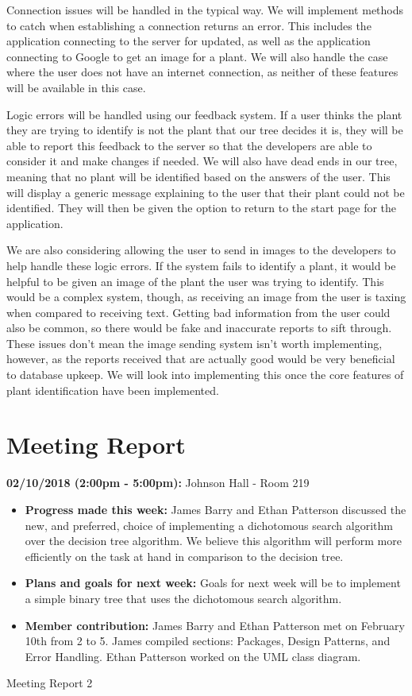 \documentclass[a4paper]{article}
\begin{document}
Connection issues will be handled in the typical way. We will implement methods to catch when establishing a connection returns an error. This includes the application connecting to the server for updated, as well as the application connecting to Google to get an image for a plant. We will also handle the case where the user does not have an internet connection, as neither of these features will be available in this case.

Logic errors will be handled using our feedback system. If a user thinks the plant they are trying to identify is not the plant that our tree decides it is, they will be able to report this feedback to the server so that the developers are able to consider it and make changes if needed. We will also have dead ends in our tree, meaning that no plant will be identified based on the answers of the user. This will display a generic message explaining to the user that their plant could not be identified. They will then be given the option to return to the start page for the application.

We are also considering allowing the user to send in images to the developers to help handle these logic errors. If the system fails to identify a plant, it would be helpful to be given an image of the plant the user was trying to identify. This would be a complex system, though, as receiving an image from the user is taxing when compared to receiving text. Getting bad information from the user could also be common, so there would be fake and inaccurate reports to sift through. These issues don't mean the image sending system isn't worth implementing, however, as the reports received that are actually good would be very beneficial to database upkeep. We will look into implementing this once the core features of plant identification have been implemented. 

\pagebreak
\section{Meeting Report}
\textbf{02/10/2018 (2:00pm - 5:00pm):} Johnson Hall - Room 219
\begin{itemize}
\item \textbf{Progress made this week:} James Barry and Ethan Patterson discussed the new, and preferred, choice of implementing a dichotomous search algorithm over the decision tree algorithm. We believe this algorithm will perform more efficiently on the task at hand in comparison to the decision tree.
\item \textbf{Plans and goals for next week:} Goals for next week will be to implement a simple binary tree that uses the dichotomous search algorithm.
\item \textbf{Member contribution:} James Barry and Ethan Patterson met on February 10th from 2 to 5. James compiled sections: Packages, Design Patterns, and Error Handling. Ethan Patterson worked on the UML class diagram. 
\end{itemize}
Meeting Report 2
\end{document}
